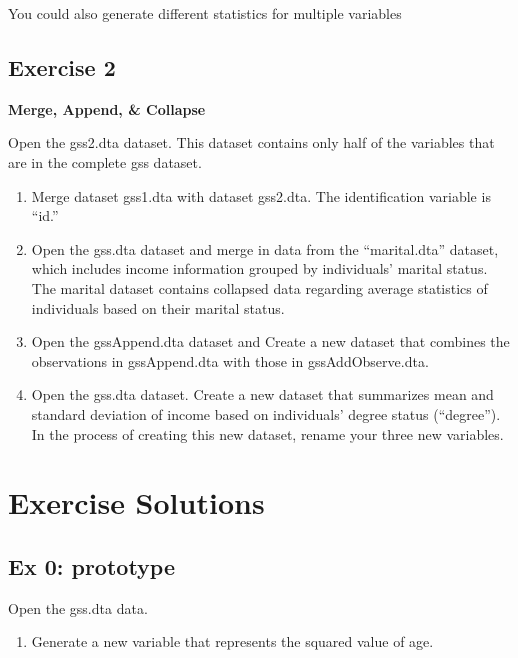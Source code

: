 \documentclass[]{book}
\providecommand{\tightlist}{%
  \setlength{\itemsep}{0pt}\setlength{\parskip}{0pt}}
\begin{document}
You could also generate different statistics for multiple variables

\subsection{Exercise 2}\label{exercise-2-5}

\textbf{Merge, Append, \& Collapse}

Open the gss2.dta dataset. This dataset contains only half of the
variables that are in the complete gss dataset.

\begin{enumerate}
\def\labelenumi{\arabic{enumi}.}
\tightlist
\item
  Merge dataset gss1.dta with dataset gss2.dta. The identification
  variable is ``id.''
\item
  Open the gss.dta dataset and merge in data from the ``marital.dta''
  dataset, which includes income information grouped by individuals'
  marital status. The marital dataset contains collapsed data regarding
  average statistics of individuals based on their marital status.
\item
  Open the gssAppend.dta dataset and Create a new dataset that combines
  the observations in gssAppend.dta with those in gssAddObserve.dta.
\item
  Open the gss.dta dataset. Create a new dataset that summarizes mean
  and standard deviation of income based on individuals' degree status
  (``degree''). In the process of creating this new dataset, rename your
  three new variables.
\end{enumerate}

\section{Exercise Solutions}\label{exercise-solutions-7}

\subsection{Ex 0: prototype}\label{ex-0-prototype-7}

Open the gss.dta data.

\begin{enumerate}
\def\labelenumi{\arabic{enumi}.}
\tightlist
\item
  Generate a new variable that represents the squared value of age.
\end{enumerate}
\end{document}
